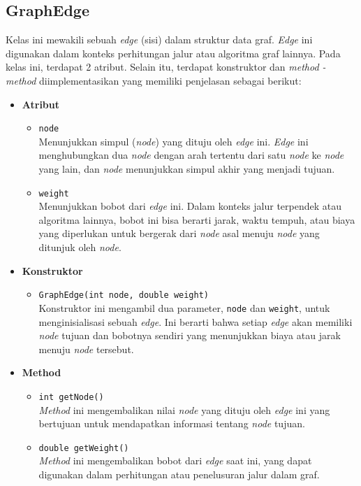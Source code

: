 \subsection{GraphEdge}
Kelas ini mewakili sebuah \textit{edge} (sisi) dalam struktur data graf. \textit{Edge} ini digunakan dalam konteks perhitungan jalur atau algoritma graf lainnya. Pada kelas ini, terdapat 2 atribut. Selain itu, terdapat konstruktor dan \textit{method - method} diimplementasikan yang memiliki penjelasan sebagai berikut:
\begin{itemize}
    \item \textbf{Atribut}
    \begin{itemize}
        \item \texttt{node}
        \\ Menunjukkan simpul (\textit{node}) yang dituju oleh \textit{edge} ini. \textit{Edge} ini menghubungkan dua \textit{node} dengan arah tertentu dari satu \textit{node} ke \textit{node} yang lain, dan \textit{node} menunjukkan simpul akhir yang menjadi tujuan.
        \item \texttt{weight}
        \\ Menunjukkan bobot dari \textit{edge} ini. Dalam konteks jalur terpendek atau algoritma lainnya, bobot ini bisa berarti jarak, waktu tempuh, atau biaya yang diperlukan untuk bergerak dari \textit{node} asal menuju \textit{node} yang ditunjuk oleh \textit{node}.
    \end{itemize}

    \item \textbf{Konstruktor}
    \begin{itemize}
        \item \texttt{GraphEdge(int node, double weight)}
        \\ Konstruktor ini mengambil dua parameter, \texttt{node} dan \texttt{weight}, untuk menginisialisasi sebuah \textit{edge}. Ini berarti bahwa setiap \textit{edge} akan memiliki \textit{node} tujuan dan bobotnya sendiri yang menunjukkan biaya atau jarak menuju \textit{node} tersebut.
    \end{itemize}

    \item \textbf{Method}
    \begin{itemize}
        \item \texttt{int getNode()}
        \\ \textit{Method} ini mengembalikan nilai \textit{node} yang dituju oleh \textit{edge} ini yang bertujuan untuk mendapatkan informasi tentang \textit{node} tujuan.
        \item \texttt{double getWeight()}
        \\ \textit{Method} ini mengembalikan bobot dari \textit{edge} saat ini, yang dapat digunakan dalam perhitungan atau penelusuran jalur dalam graf.
    \end{itemize}
\end{itemize}

